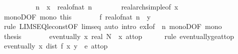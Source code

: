 \begin{isabellebody}
\ \ \isamarkupfalse%
\ {\isacharminus}{\kern0pt}\isanewline
\ \ \ \ \isamarkupfalse%
\ n\ \ {\isachardoublequoteopen}x\ {\isasymle}\ real{\isacharunderscore}{\kern0pt}of{\isacharunderscore}{\kern0pt}nat\ n{\isachardoublequoteclose}\isanewline
\ \ \ \ \ \ \isamarkupfalse%
\ real{\isacharunderscore}{\kern0pt}arch{\isacharunderscore}{\kern0pt}simple{\isacharbrackleft}{\kern0pt}of\ x{\isacharbrackright}{\kern0pt}\ \isacommand{{\isachardot}{\kern0pt}{\isachardot}{\kern0pt}}\isamarkupfalse%
\isanewline
\ \ \ \ \isamarkupfalse%
\ monoD{\isacharbrackleft}{\kern0pt}OF\ mono\ this{\isacharbrackright}{\kern0pt}\isanewline
\ \ \ \ \isamarkupfalse%
\ \isamarkupfalse%
\ {\isachardoublequoteopen}f\ {\isacharparenleft}{\kern0pt}real{\isacharunderscore}{\kern0pt}of{\isacharunderscore}{\kern0pt}nat\ n{\isacharparenright}{\kern0pt}\ {\isasymle}\ y{\isachardoublequoteclose}\isanewline
\ \ \ \ \ \ \isamarkupfalse%
\ {\isacharparenleft}{\kern0pt}rule\ LIMSEQ{\isacharunderscore}{\kern0pt}le{\isacharunderscore}{\kern0pt}const{\isacharbrackleft}{\kern0pt}OF\ limseq{\isacharbrackright}{\kern0pt}{\isacharparenright}{\kern0pt}\ {\isacharparenleft}{\kern0pt}auto\ intro{\isacharbang}{\kern0pt}{\isacharcolon}{\kern0pt}\ exI{\isacharbrackleft}{\kern0pt}of\ {\isacharunderscore}{\kern0pt}\ n{\isacharbrackright}{\kern0pt}\ monoD{\isacharbrackleft}{\kern0pt}OF\ mono{\isacharbrackright}{\kern0pt}{\isacharparenright}{\kern0pt}\isanewline
\ \ \ \ \isamarkupfalse%
\ \isamarkupfalse%
\ {\isacharquery}{\kern0pt}thesis\ \isacommand{{\isachardot}{\kern0pt}}\isamarkupfalse%
\isanewline
\ \ \isamarkupfalse%
\isanewline
\ \ \isamarkupfalse%
\ {\isachardoublequoteopen}eventually\ {\isacharparenleft}{\kern0pt}{\isasymlambda}x{\isachardot}{\kern0pt}\ real\ N\ {\isasymle}\ x{\isacharparenright}{\kern0pt}\ at{\isacharunderscore}{\kern0pt}top{\isachardoublequoteclose}\isanewline
\ \ \ \ \isamarkupfalse%
\ {\isacharparenleft}{\kern0pt}rule\ eventually{\isacharunderscore}{\kern0pt}ge{\isacharunderscore}{\kern0pt}at{\isacharunderscore}{\kern0pt}top{\isacharparenright}{\kern0pt}\isanewline
\ \ \isamarkupfalse%
\ \isamarkupfalse%
\ {\isachardoublequoteopen}eventually\ {\isacharparenleft}{\kern0pt}{\isasymlambda}x{\isachardot}{\kern0pt}\ dist\ {\isacharparenleft}{\kern0pt}f\ x{\isacharparenright}{\kern0pt}\ y\ {\isacharless}{\kern0pt}\ e{\isacharparenright}{\kern0pt}\ at{\isacharunderscore}{\kern0pt}top{\isachardoublequoteclose}\isanewline

\end{isabellebody}
